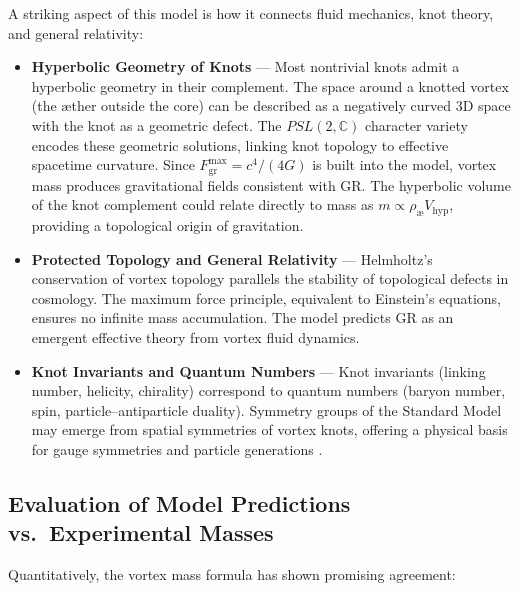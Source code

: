     A striking aspect of this model is how it connects fluid mechanics, knot theory, and general relativity:

    \begin{itemize}
        \item \textbf{Hyperbolic Geometry of Knots} — Most nontrivial knots admit a hyperbolic geometry in their complement. The space around a knotted vortex (the æther outside the core) can be described as a negatively curved 3D space with the knot as a geometric defect. The $PSL(2,\mathbb{C})$ character variety encodes these geometric solutions, linking knot topology to effective spacetime curvature. Since $F^{\max}_{\text{gr}} = c^4/(4G)$ is built into the model, vortex mass produces gravitational fields consistent with GR. The hyperbolic volume of the knot complement could relate directly to mass as $m \propto \rho_{\text{\ae}} V_{\text{hyp}}$, providing a topological origin of gravitation.

        \item \textbf{Protected Topology and General Relativity} — Helmholtz’s conservation of vortex topology parallels the stability of topological defects in cosmology. The maximum force principle, equivalent to Einstein’s equations, ensures no infinite mass accumulation. The model predicts GR as an emergent effective theory from vortex fluid dynamics.

        \item \textbf{Knot Invariants and Quantum Numbers} — Knot invariants (linking number, helicity, chirality) correspond to quantum numbers (baryon number, spin, particle–antiparticle duality). Symmetry groups of the Standard Model may emerge from spatial symmetries of vortex knots, offering a physical basis for gauge symmetries and particle generations \cite{Iskandarani2025f,Avrin2012}.
    \end{itemize}

    \subsection{Evaluation of Model Predictions vs.\ Experimental Masses}

    Quantitatively, the vortex mass formula has shown promising agreement:

